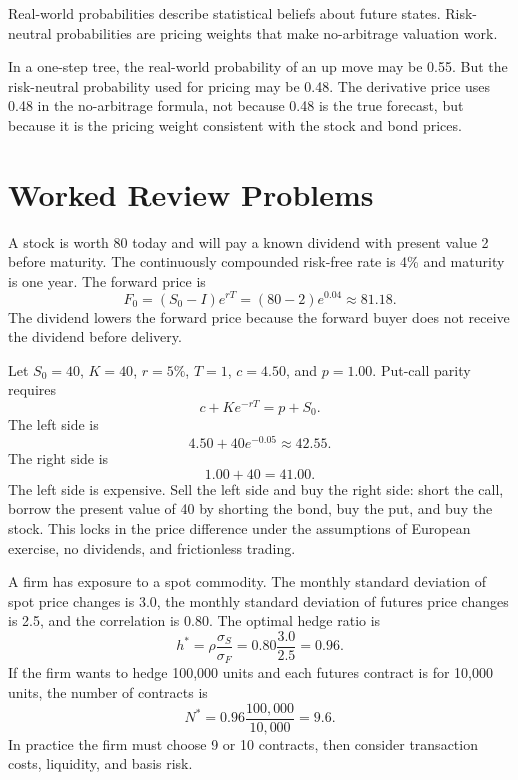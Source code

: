 Real-world probabilities describe statistical beliefs about future states.
Risk-neutral probabilities are pricing weights that make no-arbitrage valuation
work.

\begin{exmp}
In a one-step tree, the real-world probability of an up move may be 0.55. But
the risk-neutral probability used for pricing may be 0.48. The derivative price
uses 0.48 in the no-arbitrage formula, not because 0.48 is the true forecast,
but because it is the pricing weight consistent with the stock and bond prices.
\end{exmp}

\section{Worked Review Problems}

\begin{exmp}
A stock is worth 80 today and will pay a known dividend with present value 2
before maturity. The continuously compounded risk-free rate is 4\% and maturity
is one year. The forward price is
\[
    F_0=(S_0-I)e^{rT}=(80-2)e^{0.04}\approx 81.18.
\]
The dividend lowers the forward price because the forward buyer does not receive
the dividend before delivery.
\end{exmp}

\begin{exmp}
Let $S_0=40$, $K=40$, $r=5\%$, $T=1$, $c=4.50$, and $p=1.00$. Put-call parity
requires
\[
    c+Ke^{-rT}=p+S_0.
\]
The left side is
\[
    4.50+40e^{-0.05}\approx 42.55.
\]
The right side is
\[
    1.00+40=41.00.
\]
The left side is expensive. Sell the left side and buy the right side:
short the call, borrow the present value of 40 by shorting the bond, buy the put,
and buy the stock. This locks in the price difference under the assumptions of
European exercise, no dividends, and frictionless trading.
\end{exmp}

\begin{exmp}
A firm has exposure to a spot commodity. The monthly standard deviation of spot
price changes is 3.0, the monthly standard deviation of futures price changes is
2.5, and the correlation is 0.80. The optimal hedge ratio is
\[
    h^*=\rho\frac{\sigma_S}{\sigma_F}
    =
    0.80\frac{3.0}{2.5}
    =
    0.96.
\]
If the firm wants to hedge 100,000 units and each futures contract is for 10,000
units, the number of contracts is
\[
    N^*=0.96\frac{100{,}000}{10{,}000}=9.6.
\]
In practice the firm must choose 9 or 10 contracts, then consider transaction
costs, liquidity, and basis risk.
\end{exmp}

